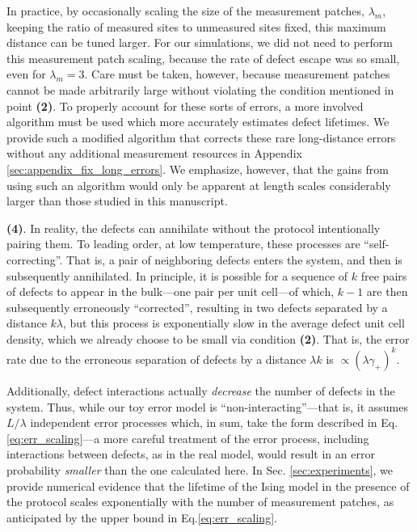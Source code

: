 \documentclass[twocolumn,superscriptaddress,aps,prb,floatfix]{revtex4-1}
\begin{document}
 In practice, by occasionally scaling the size of the measurement patches, $\lambda_m$, keeping the ratio of measured sites to unmeasured sites fixed, this maximum distance can be tuned larger.  For our simulations, we did not need to perform this measurement patch scaling, because the rate of defect escape was so small, even for $\lambda_m=3$.  Care must be taken, however, because measurement patches cannot be made arbitrarily large without violating the condition mentioned in point \textbf{(2)}.  To properly account for these sorts of errors, a more involved algorithm must be used which more accurately estimates defect lifetimes.  We provide such a modified algorithm that corrects these rare long-distance errors without any additional measurement resources in Appendix \ref{sec:appendix_fix_long_errors}.  We emphasize, however, that the gains from using such an algorithm would only be apparent at length scales considerably larger than those studied in this manuscript.

 \textbf{(4)}. In reality, the defects can annihilate without the protocol intentionally pairing them.  To leading order, at low temperature, these processes are ``self-correcting''.  That is, a pair of neighboring defects enters the system, and then is subsequently annihilated.  In principle, it is possible for a sequence of $k$ free pairs of defects to appear in the bulk---one pair per unit cell---of which, $k-1$ are then subsequently erroneously ``corrected'', resulting in two defects separated by a distance $k \lambda$, but this process is exponentially slow in the average defect unit cell density, which we already choose to be small via condition \textbf{(2)}.  That is, the error rate due to the erroneous  separation of defects by a distance $\lambda k$ is $\propto(\lambda \gamma_+)^k$.
 
 Additionally, defect interactions actually \emph{decrease} the number of defects in the system.  Thus, while our toy error model is ``non-interacting''---that is, it assumes $L/\lambda$ independent error processes which, in sum, take the form described in Eq. \ref{eq:err_scaling}---a more careful treatment of the error process, including interactions between defects, as in the real model, would result in an error probability \emph{smaller} than the one calculated here.  In Sec. \ref{sec:experiments}, we provide numerical evidence that the lifetime of the Ising model in the presence of the protocol scales exponentially with the number of measurement patches, as anticipated by the upper bound in Eq.\ref{eq:err_scaling}.
 
\end{document}
